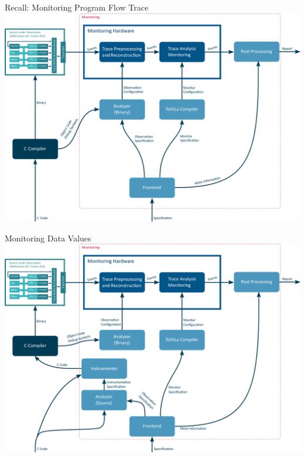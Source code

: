 
\begin{frame}[plain]{Recall: Monitoring Program Flow Trace}
  \centering
  \includegraphics[width=.9\textwidth]{content/chapter_hardware_srv/overview-program-trace.pdf}
\end{frame}

\begin{frame}[plain]{Monitoring Data Values}
  \centering
  \includegraphics[width=.9\textwidth]{content/chapter_hardware_srv/overview-itm.pdf}
\end{frame}

